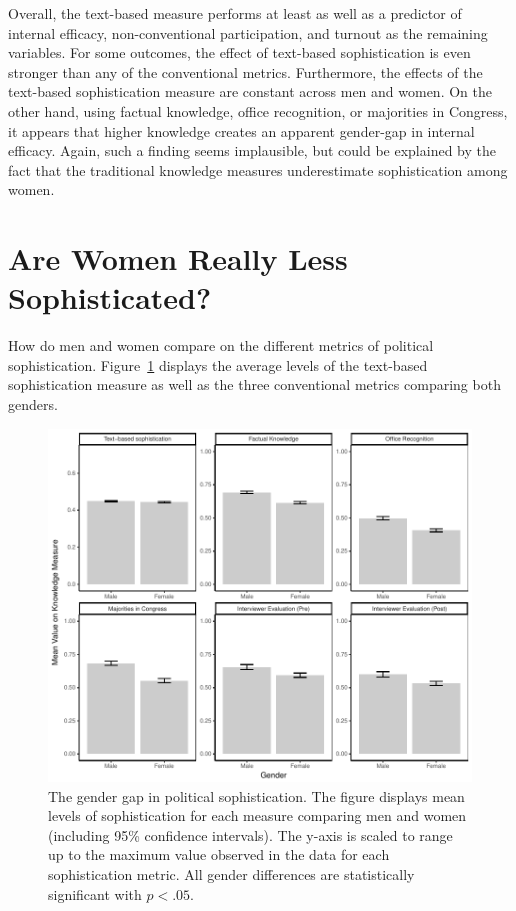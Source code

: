 \documentclass[12pt]{article}
\begin{document}
Overall, the text-based measure performs at least as well as a predictor of internal efficacy, non-conventional participation, and turnout as the remaining variables. For some outcomes, the effect of text-based sophistication is even stronger than any of the conventional metrics. Furthermore, the effects of the text-based sophistication measure are constant across men and women. On the other hand, using factual knowledge, office recognition, or majorities in Congress, it appears that higher knowledge creates an apparent gender-gap in internal efficacy. Again, such a finding seems implausible, but could be explained by the fact that the traditional knowledge measures underestimate sophistication among women.



\section*{Are Women Really Less Sophisticated?}

How do men and women compare on the different metrics of political sophistication. Figure~\ref{fig:meandiff} displays the average levels of the text-based sophistication measure as well as the three conventional metrics comparing both genders.

\begin{figure}[h]\centering
\includegraphics{../fig/meandiff.pdf}
\caption{The gender gap in political sophistication. The figure displays mean levels of sophistication for each measure comparing men and women (including 95\% confidence intervals). The y-axis is scaled to range up to the maximum value observed in the data for each sophistication metric. All gender differences are statistically significant with $p<.05$.}\label{fig:meandiff}
\end{figure}
\end{document}
